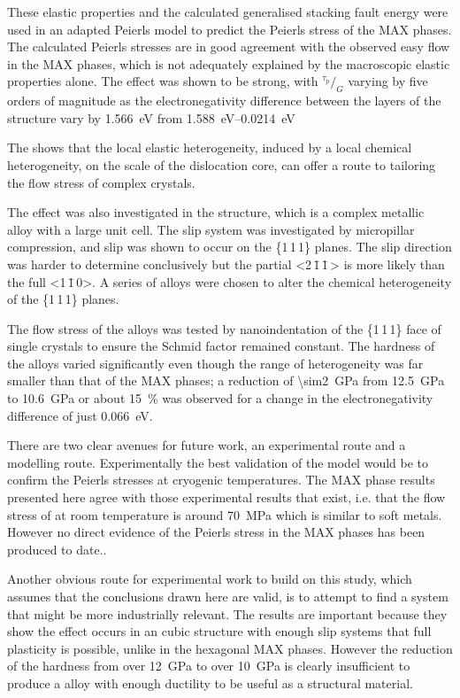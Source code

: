 These elastic properties and the calculated generalised stacking fault energy were used in an adapted Peierls model to predict the Peierls stress of the MAX phases. The calculated Peierls stresses are in good agreement with the observed easy flow in the MAX phases, which is not adequately explained by the macroscopic elastic properties alone. The effect was shown to be strong, with $^{\tau_p}\!/_{G}$ varying by five orders of magnitude as the electronegativity difference between the layers of the structure vary by \SI{1.566}{\electronvolt} from \SIrange{1.588}{0.0214}{\electronvolt}

The shows that the local elastic heterogeneity, induced by a local chemical heterogeneity, on the scale of the dislocation core, can offer a route to tailoring the flow stress of complex crystals.

The effect was also investigated in the  structure, which is a complex metallic alloy with a large unit cell. The slip system was investigated by micropillar compression, and slip was shown to occur on the \{1\,1\,1\} planes. The slip direction was harder to determine conclusively but the partial <2\,\={1}\,\={1}\,> is more likely than the full <1\,\={1}\,0>. A series of alloys were chosen to alter the chemical heterogeneity of the  \{1\,1\,1\} planes. 

The flow stress of the alloys was tested by nanoindentation of the \{1\,1\,1\} face of single crystals to ensure the Schmid factor remained constant. The hardness of the alloys varied significantly even though the range of heterogeneity was far smaller than that of the MAX phases; a reduction of \SI{\sim2}{\giga\pascal} from \SI{12.5}{\giga\pascal} to \SI{10.6}{\giga\pascal} or about \SI{15}{\percent} was observed for a change in the electronegativity difference of just \SI{0.066}{\electronvolt}.



There are two clear avenues for future work, an experimental route and a modelling route. Experimentally the best validation of the model would be to confirm the Peierls stresses at cryogenic temperatures. The MAX phase results presented here agree with those experimental results that exist, i.e. that the flow stress of  at room temperature is around \SI{70}{\mega\pascal} which is similar to soft metals. However no direct evidence of the Peierls stress in the MAX phases has been produced to date..

Another obvious route for experimental work to build on this study, which assumes that the conclusions drawn here are valid, is to attempt to find a system that might be more industrially relevant. The  results are important because they show the effect occurs in an cubic structure with enough slip systems that full plasticity is possible, unlike in the hexagonal MAX phases. However the reduction of the hardness from over \SI{12}{\giga\pascal} to over \SI{10}{\giga\pascal} is clearly insufficient to produce a alloy with enough ductility to be useful as a structural material.


